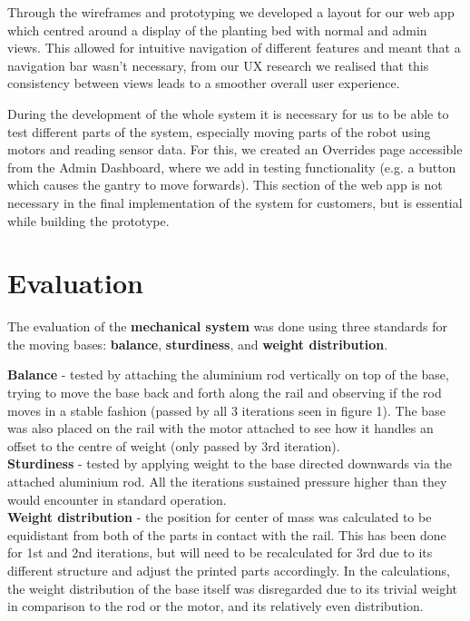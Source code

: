 \documentclass{article}
\begin{document}
Through the wireframes and prototyping we developed a layout for our web app which centred around a display of the planting bed with normal and admin views. This allowed for intuitive navigation of different features and meant that a navigation bar wasn't necessary, from our UX research we realised that this consistency between views leads to a smoother overall user experience.


During the development of the whole system it is necessary for us to be able to test different parts of the system, especially moving parts of the robot using motors and reading sensor data. For this, we created an Overrides page accessible from the Admin Dashboard, where we add in testing functionality (e.g. a button which causes the gantry to move forwards). This section of the web app is not necessary in the final implementation of the system for customers, but is essential while building the prototype.




\section{Evaluation}


The evaluation of the \textbf{mechanical system} was done using three standards for the moving bases: \textbf{balance}, \textbf{sturdiness}, and \textbf{weight distribution}.
\\
\vspace{-3mm}

\textbf{Balance} - tested by attaching the aluminium rod vertically on top of the base, trying to move the base back and forth along the rail and observing if the rod moves in a stable fashion (passed by all 3 iterations seen in figure 1). The base was also placed on the rail with the motor attached to see how it handles an offset to the centre of weight (only passed by 3rd iteration). \\
\textbf{Sturdiness} - tested by applying weight to the base directed downwards via the attached aluminium rod. All the iterations sustained pressure higher than they would encounter in standard operation.\\
\textbf{Weight distribution} - the position for center of mass was calculated to be equidistant from both of the parts in contact with the rail. This has been done for 1st and 2nd iterations, but will need to be recalculated for 3rd due to its different structure and adjust the printed parts accordingly. In the calculations, the weight distribution of the base itself was disregarded due to its trivial weight in comparison to the rod or the motor, and its relatively even distribution. 
\end{document}
